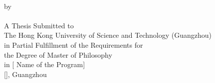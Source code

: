 \thispagestyle{empty}
\begin{center}
{\fontsize{12}{14}\selectfont \bfseries \myTitle} 
\\
\vspace{5\baselineskip}
{\fontsize{12}{14} by} \\
\vspace{1\baselineskip}
\textbf{\selectfont \myName}
\vspace{5\baselineskip}
\\ \selectfont A Thesis Submitted to \\
The Hong Kong University of Science and Technology (Guangzhou) \\ 
in Partial Fulfillment of the Requirements for \\
the Degree of Master of Philosophy \\
in [ Name of the Program] \\
\vspace{3\baselineskip}
[\myDate], Guangzhou
\end{center}

